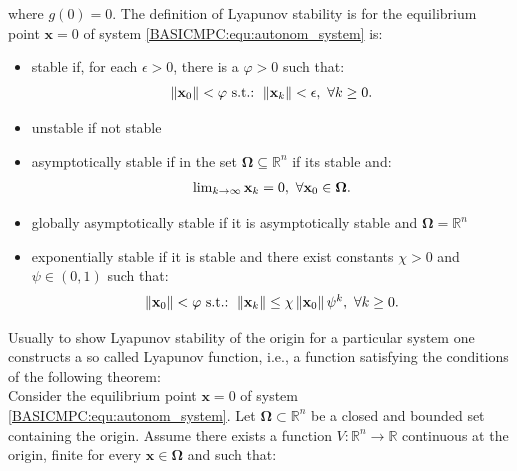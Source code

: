     where $g(0)=0$. The definition of Lyapunov stability is for the equilibrium point $\textbf{x}=0$ of system \ref{BASICMPC:equ:autonom_system} is:
    \begin{itemize}
    \item stable if, for each $\epsilon>0$, there is a $\varphi>0$ such that:
        \begin{equation}
        \begin{array}{c}
                \left\lVert\textbf{x}_0\right\rVert<\varphi\textnormal{ s.t.: }\left\lVert\textbf{x}_k\right\rVert<\epsilon,\textnormal{ }\forall k\geq0.
            \end{array}
            \label{BASICMPC:equ:lyapunov_1}
        \end{equation}

    \item unstable if not stable

    \item asymptotically stable if in the set $\boldsymbol{\Omega}\subseteq\mathbb{R}^n$ if its stable and:
       \begin{equation}
        \begin{array}{c}
                \lim_{k\rightarrow\infty}\textbf{x}_k=0,\textnormal{ }\forall\textbf{x}_0\in\boldsymbol{\Omega}.
            \end{array}
            \label{BASICMPC:equ:lyapunov_2}
        \end{equation}

    \item globally asymptotically stable if it is asymptotically stable and $\boldsymbol{\Omega}=\mathbb{R}^n$

    \item exponentially stable if it is stable and there exist constants $\chi>0$ and $\psi\in(0,1)$ such that:
    \begin{equation}
        \begin{array}{c}
                \left\lVert\textbf{x}_0\right\rVert<\varphi\textnormal{ s.t.: }\left\lVert\textbf{x}_k\right\rVert\leq\chi\left\lVert\textbf{x}_0\right\rVert\psi^k,\textnormal{ }\forall k\geq0.
            \end{array}
            \label{BASICMPC:equ:lyapunov_3}
        \end{equation}


    \end{itemize}

    Usually to show Lyapunov stability of the origin for a particular system one constructs a so called Lyapunov function, i.e., a function satisfying the conditions of the following theorem:\\
    Consider the equilibrium point $\textbf{x}=0$ of system \ref{BASICMPC:equ:autonom_system}. Let $\boldsymbol{\Omega}\subset\mathbb{R}^n$ be a closed and bounded set containing the origin. Assume there exists a function $V:\mathbb{R}^n\rightarrow\mathbb{R}$ continuous at the origin, finite for every $\textbf{x}\in\boldsymbol{\Omega}$ and such that:

